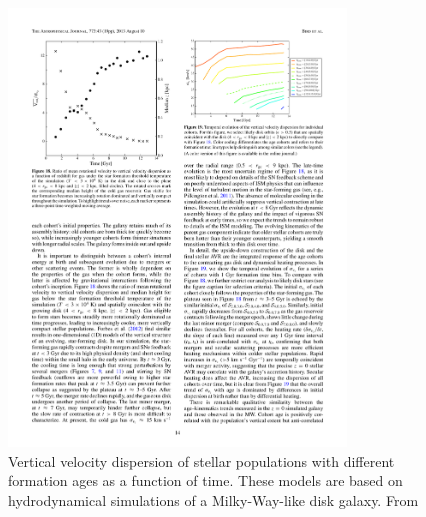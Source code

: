 \begin{figure}
  \centering
  \includegraphics[width=0.8\textwidth]{Introduction/figs/bird_13.pdf}
  \caption[Dynamical settling in a Milky-Way-like galaxy
  model]{\fixspacing\label{intro:fig:bird}Vertical velocity dispersion
    of stellar populations with different formation ages as a function
    of time. These models are based on hydrodynamical simulations of a
    Milky-Way-like disk galaxy. From \citet{Bird13}}
\end{figure}

